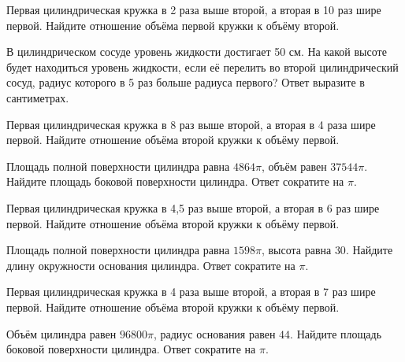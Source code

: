 \documentclass[4apaper]{article}
\begin{document}
\begin{taskBN}{86}
 Первая цилиндрическая кружка в 2 раза выше второй, а вторая в 10 раз шире первой. Найдите отношение объёма первой кружки к объёму второй.
\end{taskBN}

\begin{taskBN}{87}
В цилиндрическом сосуде уровень жидкости достигает 50 см. На какой высоте будет находиться уровень жидкости, если её перелить во второй цилиндрический сосуд, радиус которого в 5 раз больше радиуса первого? Ответ выразите в сантиметрах.
\end{taskBN}

\begin{taskBN}{88}
 Первая цилиндрическая кружка в 8 раз выше второй, а вторая в 4 раза шире первой. Найдите отношение объёма второй кружки к объёму первой.
\end{taskBN}

\begin{taskBN}{89}
Площадь полной поверхности цилиндра равна $4864\pi$, объём равен $37544\pi$. Найдите площадь боковой поверхности цилиндра. Ответ сократите на $\pi$.
\end{taskBN}

\begin{taskBN}{90}
 Первая цилиндрическая кружка в 4,5 раз выше второй, а вторая в 6 раз шире первой. Найдите отношение объёма второй кружки к объёму первой.
\end{taskBN}

\begin{taskBN}{91}
Площадь полной поверхности цилиндра равна $1598\pi$, высота равна $30$. Найдите длину окружности основания цилиндра. Ответ сократите на $\pi$.
\end{taskBN}

\begin{taskBN}{92}
 Первая цилиндрическая кружка в 4 раза выше второй, а вторая в 7 раз шире первой. Найдите отношение объёма второй кружки к объёму первой.
\end{taskBN}

\begin{taskBN}{93}
Объём цилиндра равен $96800\pi$, радиус основания равен $44$. Найдите площадь боковой поверхности цилиндра. Ответ сократите на $\pi$.
\end{taskBN}
\end{document}
